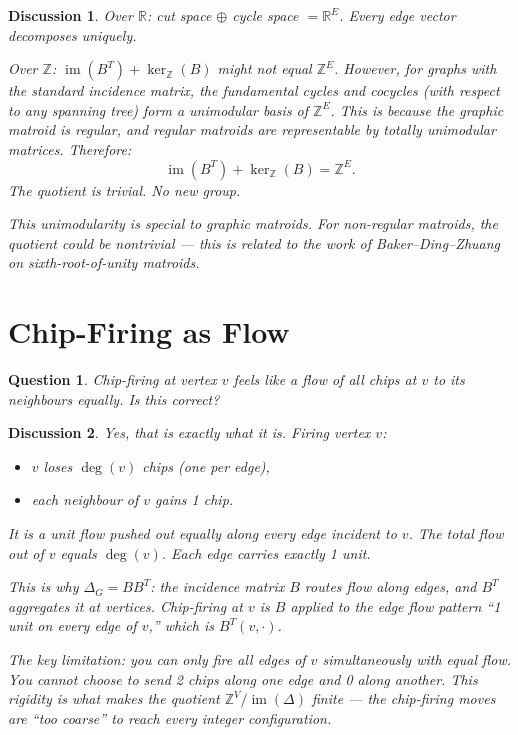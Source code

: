 \documentclass[11pt]{article}
\newcommand{\Z}{\mathbb{Z}}
\newcommand{\R}{\mathbb{R}}
\newtheorem{question}{Question}
\newtheorem{answer}{Discussion}
\begin{document}
\begin{answer}
Over $\R$: cut space $\oplus$ cycle space $= \R^E$. Every edge vector
decomposes uniquely.

Over $\Z$: $\operatorname{im}(B^T) + \ker_{\Z}(B)$ might not equal $\Z^E$.
However, for graphs with the standard incidence matrix, the fundamental cycles
and cocycles (with respect to any spanning tree) form a \emph{unimodular} basis
of $\Z^E$. This is because the graphic matroid is regular, and regular matroids
are representable by totally unimodular matrices. Therefore:
\[
  \operatorname{im}(B^T) + \ker_{\Z}(B) = \Z^E.
\]
The quotient is trivial. No new group.

This unimodularity is special to graphic matroids. For non-regular matroids,
the quotient could be nontrivial --- this is related to the work of
Baker--Ding--Zhuang on sixth-root-of-unity matroids.
\end{answer}


\section{Chip-Firing as Flow}

\begin{question}
Chip-firing at vertex $v$ feels like a flow of all chips at $v$ to its
neighbours equally. Is this correct?
\end{question}

\begin{answer}
Yes, that is exactly what it is. Firing vertex $v$:
\begin{itemize}
  \item $v$ loses $\deg(v)$ chips (one per edge),
  \item each neighbour of $v$ gains 1 chip.
\end{itemize}
It is a unit flow pushed out equally along every edge incident to $v$. The
total flow out of $v$ equals $\deg(v)$. Each edge carries exactly 1 unit.

This is why $\Delta_G = BB^T$: the incidence matrix $B$ routes flow along
edges, and $B^T$ aggregates it at vertices. Chip-firing at $v$ is $B$ applied
to the edge flow pattern ``1 unit on every edge of $v$,'' which is
$B^T(v, \cdot)$.

The key limitation: you can only fire all edges of $v$ simultaneously with
equal flow. You cannot choose to send 2 chips along one edge and 0 along
another. This rigidity is what makes the quotient $\Z^V / \operatorname{im}(\Delta)$
finite --- the chip-firing moves are ``too coarse'' to reach every integer
configuration.
\end{answer}
\end{document}
